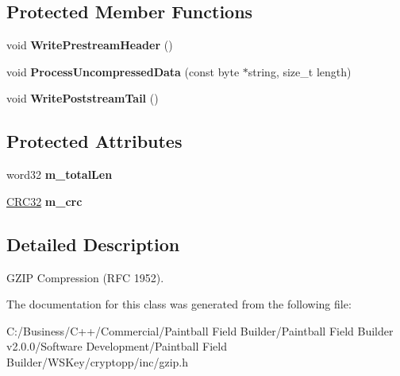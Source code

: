 \subsection*{Protected Member Functions}
\begin{DoxyCompactItemize}
\item 
\hypertarget{class_gzip_ad92840a92180cb616116ffbe235b0d7e}{
void {\bfseries WritePrestreamHeader} ()}
\label{class_gzip_ad92840a92180cb616116ffbe235b0d7e}

\item 
\hypertarget{class_gzip_a518a1747578e16c102ae8430e1dca659}{
void {\bfseries ProcessUncompressedData} (const byte $\ast$string, size\_\-t length)}
\label{class_gzip_a518a1747578e16c102ae8430e1dca659}

\item 
\hypertarget{class_gzip_a48c4ba2a78f02326d8b244dfaddfa220}{
void {\bfseries WritePoststreamTail} ()}
\label{class_gzip_a48c4ba2a78f02326d8b244dfaddfa220}

\end{DoxyCompactItemize}
\subsection*{Protected Attributes}
\begin{DoxyCompactItemize}
\item 
\hypertarget{class_gzip_a0020bd0aa27e3335993e4ea2836e5295}{
word32 {\bfseries m\_\-totalLen}}
\label{class_gzip_a0020bd0aa27e3335993e4ea2836e5295}

\item 
\hypertarget{class_gzip_a4f297733a60374b3f7a7d5ef2dc10c2a}{
\hyperlink{class_c_r_c32}{CRC32} {\bfseries m\_\-crc}}
\label{class_gzip_a4f297733a60374b3f7a7d5ef2dc10c2a}

\end{DoxyCompactItemize}


\subsection{Detailed Description}
GZIP Compression (RFC 1952). 

The documentation for this class was generated from the following file:\begin{DoxyCompactItemize}
\item 
C:/Business/C++/Commercial/Paintball Field Builder/Paintball Field Builder v2.0.0/Software Development/Paintball Field Builder/WSKey/cryptopp/inc/gzip.h\end{DoxyCompactItemize}
